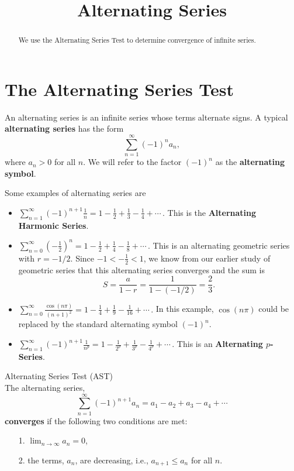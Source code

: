 \documentclass{ximera}
\title{Alternating Series}
\begin{document}
\begin{abstract}
We use the Alternating Series Test to determine convergence of infinite series.
\end{abstract}

\maketitle

\section{The Alternating Series Test}

An alternating series is an infinite series whose terms alternate signs.
A typical \textbf{alternating series} has the form 
\[
\sum_{n=1}^\infty (-1)^n a_n,
\]
where $a_n > 0$ for all $n$. We will refer to the factor $(-1)^n$ as the \textbf{alternating symbol}.

Some examples of alternating series are
\begin{itemize}

\item $\displaystyle{\sum_{n=1}^\infty (-1)^{n+1} \frac{1}{n} = 1 - \frac12 + \frac13 - \frac14 + \cdots  }\, .$  This is the \textbf{Alternating Harmonic Series}.

\item $\displaystyle{\sum_{n=0}^\infty \left(-\frac12\right)^n = 1 - \frac12 + \frac14 - \frac18 + \cdots }\, .$  This is an alternating geometric series with $r=-1/2$.
Since $-1 < -\frac12 < 1$, we know from our earlier study of geometric series that this alternating series converges and 
the sum is 
\[
S = \frac{a}{1-r} = \frac{1}{1-(-1/2)} = \frac23.
\]

\item $\displaystyle{\sum_{n=0}^\infty \frac{\cos(n\pi)}{(n+1)^2} = 1 - \frac14 + \frac19 - \frac{1}{16} + \cdots}\, .$ 
In this example, $\cos(n\pi)$ could be replaced by the standard alternating symbol $(-1)^n$.


\item $\displaystyle{\sum_{n=1}^\infty (-1)^{n+1} \frac{1}{n^p} = 1 - \frac{1}{2^p} + \frac{1}{3^p} - \frac{1}{4^p} + \cdots  }\, .$  This is an \textbf{Alternating $p$-Series}.


\end{itemize}

\begin{theorem} Alternating Series Test (AST)\\
The alternating series, 
\[
\sum_{n=1}^\infty (-1)^{n+1} a_n = a_1 - a_2 + a_3 - a_4 + \cdots
\]
\textbf{converges} if the following two conditions are met:
\begin{itemize}
\item[1.] $\displaystyle{\lim_{n\to\infty} a_n = 0}$,
\item[2.] the terms, $a_n$, are decreasing, i.e., $a_{n+1} \leq a_n$ for all $n$.
\end{itemize}
\end{theorem}
\end{document}
